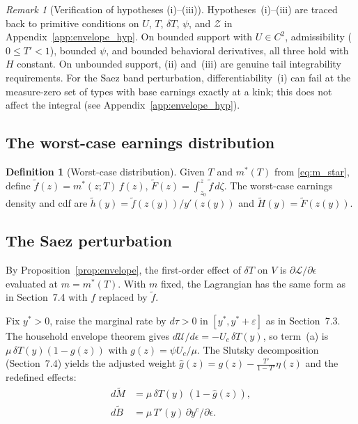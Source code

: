 \documentclass[12pt,a4paper]{article}
\theoremstyle{definition}
\newtheorem{definition}{Definition}[section]
\theoremstyle{plain}
\theoremstyle{remark}
\newtheorem{remark}{Remark}[section]
\newcommand{\zlow}{z_{\scriptscriptstyle 0}}
\newcommand{\calU}{\mathcal{U}}
\newcommand{\calZ}{\mathcal{Z}}
\newcommand{\calL}{\mathcal{L}}
\begin{document}
\begin{remark}[Verification of hypotheses (i)--(iii)]
\label{rem:integrability}
Hypotheses~(i)--(iii) are traced back to primitive
conditions on $U$, $T$, $\delta T$, $\psi$, and $\calZ$
in Appendix~\ref{app:envelope_hyp}.  On bounded support
with $U \in C^2$, admissibility ($0 \leq T' < 1$),
bounded $\psi$, and bounded behavioral derivatives,
all three hold with $H$ constant.
On unbounded support, (ii) and~(iii) are genuine tail
integrability requirements.
For the Saez band perturbation, differentiability~(i)
can fail at the measure-zero set of types with base
earnings exactly at a kink; this does not affect the
integral (see Appendix~\ref{app:envelope_hyp}).
\end{remark}


\subsection{The worst-case earnings distribution}
\label{sec:worst_case_dist}

\begin{definition}[Worst-case distribution]
\label{def:worst_case}
Given $T$ and $m^*(T)$ from \eqref{eq:m_star}, define
$\widetilde{f}(z) = m^*(z;T)\,f(z)$,
$\widetilde{F}(z) = \int_{\zlow}^z \widetilde{f}\,d\zeta$.
The worst-case earnings density and cdf are
$\widetilde{h}(y) = \widetilde{f}(z(y))/y'(z(y))$ and
$\widetilde{H}(y) = \widetilde{F}(z(y))$.
\end{definition}


\subsection{The Saez perturbation}
\label{sec:saez_perturbation}

By Proposition~\ref{prop:envelope}, the first-order effect
of $\delta T$ on $V$ is $\partial\calL/\partial\epsilon$
evaluated at $m = m^*(T)$.  With $m$ fixed, the Lagrangian
has the same form as in Section~7.4 with $f$ replaced by
$\widetilde{f}$.

Fix $y^* > 0$, raise the marginal rate by $d\tau > 0$
in $[y^*, y^* + \varepsilon]$ as in Section~7.3.
The household envelope theorem gives
$d\calU/d\epsilon = -U_c\,\delta T(y)$, so term~(a) is
$\mu\,\delta T(y)(1-g(z))$ with $g(z) = \psi U_c/\mu$.
The Slutsky decomposition (Section~7.4) yields the
adjusted weight $\hat g(z) = g(z) - \frac{T'}{1-T'}\eta(z)$
and the redefined effects:
\begin{align}
  d\widetilde{M} &= \mu\,\delta T(y)\,(1-\hat g(z)),
  \label{eq:dM} \\
  d\widetilde{B} &= \mu\,T'(y)\,\partial y^c/\partial\epsilon.
  \label{eq:dB}
\end{align}
\end{document}
